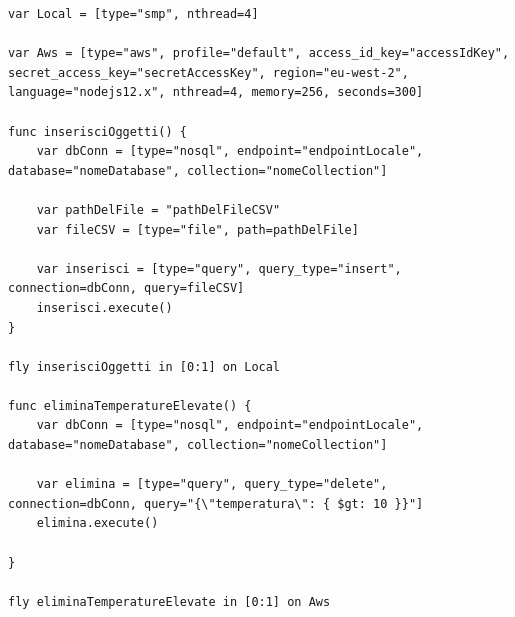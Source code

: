 \begin{lstlisting}[language=FLY,caption={Codice Python generato per la variaibile di tipo query per l’esecuzione di un’interrogazione di delete.}, label={lst:usecase:1}]
var Local = [type="smp", nthread=4]

var Aws = [type="aws", profile="default", access_id_key="accessIdKey", secret_access_key="secretAccessKey", region="eu-west-2", language="nodejs12.x", nthread=4, memory=256, seconds=300]

func inserisciOggetti() {
	var dbConn = [type="nosql", endpoint="endpointLocale", database="nomeDatabase", collection="nomeCollection"]

	var pathDelFile = "pathDelFileCSV"
	var fileCSV = [type="file", path=pathDelFile]

	var inserisci = [type="query", query_type="insert", connection=dbConn, query=fileCSV]
	inserisci.execute()
}

fly inserisciOggetti in [0:1] on Local

func eliminaTemperatureElevate() {
	var dbConn = [type="nosql", endpoint="endpointLocale", database="nomeDatabase", collection="nomeCollection"]

	var elimina = [type="query", query_type="delete", connection=dbConn, query="{\"temperatura\": { $gt: 10 }}"]
	elimina.execute()

}

fly eliminaTemperatureElevate in [0:1] on Aws
\end{lstlisting}